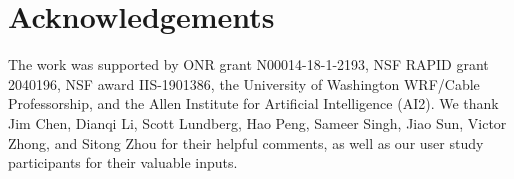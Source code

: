 \section*{Acknowledgements}
The work was supported by ONR grant N00014-18-1-2193, NSF RAPID grant 2040196, NSF award IIS-1901386, the University of Washington WRF/Cable Professorship, and the Allen Institute for Artificial Intelligence (AI2).
We thank 
Jim Chen, 
Dianqi Li,
Scott Lundberg, 
Hao Peng, 
Sameer Singh,
Jiao Sun,
Victor Zhong,
and Sitong Zhou for their helpful comments, as well as our user study participants for their valuable inputs.

